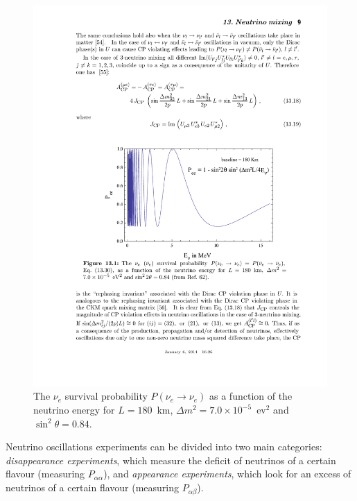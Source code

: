 \begin{figure}
    \centering
    \includegraphics[width=0.7\linewidth]{figures/oscillation.pdf}
    \caption{The $\nu_e$ survival probability $P(\nu_e\rightarrow\nu_e)$ as a function of the neutrino energy for $L=180$~km, $\Delta m^2 = 7.0 \times 10^{-5}$~ev$^2$ and $\sin^2\theta = 0.84$.}
    \label{fig:oscillation}
\end{figure}

Neutrino oscillations experiments can be divided into two main categories: \emph{disappearance experiments}, which measure the deficit of neutrinos of a certain flavour (measuring $P_{\alpha\alpha}$), and \emph{appearance experiments}, which look for an excess of neutrinos of a certain flavour (measuring $P_{\alpha\beta}$).

